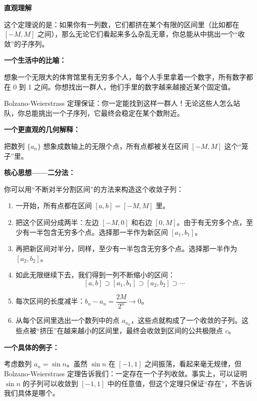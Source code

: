 \documentclass{ctexart}
\newenvironment{custom}[1]{\par\noindent \textbf{#1}\quad}{\par\vspace{1em}}
\begin{document}
\begin{custom}{直观理解}

这个定理说的是：如果你有一列数，它们都挤在某个有限的区间里（比如都在 \([-M, M]\) 之间），那么无论它们看起来多么杂乱无章，你总能从中挑出一个“收敛”的子序列。

\textbf{一个生活中的比喻：}

想象一个无限大的体育馆里有无穷多个人，每个人手里拿着一个数字，所有数字都在 0 到 1 之间。你想找出一群人，他们手里的数字越来越接近某个固定值。

Bolzano-Weierstrass 定理保证：你一定能找到这样一群人！无论这些人怎么站队，你总能挑出一个子序列，它最终会稳定在某个数附近。

\textbf{一个更直观的几何解释：}

把数列 \(\{a_n\}\) 想象成数轴上的无限个点，所有点都被关在区间 \([-M, M]\) 这个“笼子”里。

\begin{center}
\end{center}

\textbf{核心思想——二分法：}

你可以用“不断对半分割区间”的方法来构造这个收敛子列：

\begin{enumerate}
\item 一开始，所有点都在区间 \([a, b] = [-M, M]\) 里。
\item 把这个区间分成两半：左边 \([-M, 0]\) 和右边 \([0, M]\)。由于有无穷多个点，至少有一半包含无穷多个点。选择那一半作为新区间 \([a_1, b_1]\)。
\item 再把新区间对半分，同样，至少有一半包含无穷多个点。选择那一半作为 \([a_2, b_2]\)。
\item 如此无限继续下去，我们得到一列不断缩小的区间：
\[
[a, b] \supset [a_1, b_1] \supset [a_2, b_2] \supset \cdots
\]
\item 每次区间的长度减半：\(b_n - a_n = \dfrac{2M}{2^n} \to 0\)。
\item 从每个区间里选出一个数列中的点 \(a_{n_k}\)，这些点就构成了一个收敛的子列。这些点被“挤压”在越来越小的区间里，最终会收敛到区间的公共极限点 \(c\)。
\end{enumerate}

\textbf{一个具体的例子：}

考虑数列 \(a_n = \sin n\)。虽然 \(\sin n\) 在 \([-1, 1]\) 之间振荡，看起来毫无规律，但 Bolzano-Weierstrass 定理告诉我们：一定存在一个子列收敛。事实上，可以证明 \(\sin n\) 的子列可以收敛到 \([-1, 1]\) 中的任意值，但这个定理只保证“存在”，不告诉我们具体是哪个。

\end{custom}
\end{document}
